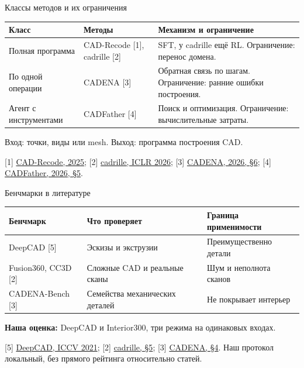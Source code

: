 \documentclass[aspectratio=169,11pt]{beamer}
\newcommand{\source}[1]{\par\vfill{\fontsize{7.2}{8.8}\selectfont\color{Muted}#1\par}}
\newcommand{\smalltext}{\fontsize{9.7}{12}\selectfont}
\begin{document}
\begin{frame}{Классы методов и их ограничения}\relax
{\smalltext
\begin{tabular}{@{}L{.23\textwidth}L{.22\textwidth}L{.48\textwidth}@{}}
\toprule
\textbf{Класс} & \textbf{Методы} & \textbf{Механизм и ограничение}\\
\midrule
Полная программа & CAD-Recode [1], cadrille [2] & SFT, у cadrille ещё RL. Ограничение: перенос домена.\\
По одной операции & CADENA [3] & Обратная связь по шагам. Ограничение: ранние ошибки построения.\\
Агент с инструментами & CADFather [4] & Поиск и оптимизация. Ограничение: вычислительные затраты.\\
\bottomrule
\end{tabular}}
\par\medskip
{\smalltext Вход: точки, виды или mesh. Выход: программа построения CAD.}
\source{[1] \href{https://arxiv.org/abs/2412.14042}{CAD-Recode, 2025};
[2] \href{https://arxiv.org/abs/2505.22914}{cadrille, ICLR 2026};
[3] \href{https://arxiv.org/abs/2608.00799}{CADENA, 2026, §6};
[4] \href{https://arxiv.org/abs/2610.09127}{CADFather, 2026, §5}.}
\end{frame}

\begin{frame}{Бенчмарки в литературе}\relax
{\smalltext
\begin{tabular}{@{}L{.22\textwidth}L{.34\textwidth}L{.37\textwidth}@{}}
\toprule
\textbf{Бенчмарк} & \textbf{Что проверяет} & \textbf{Граница применимости}\\
\midrule
DeepCAD [5] & Эскизы и экструзии & Преимущественно детали\\
Fusion360, CC3D [2] & Сложные CAD и реальные сканы & Шум и неполнота сканов\\
CADENA-Bench [3] & Семейства механических деталей & Не покрывает интерьер\\
\bottomrule
\end{tabular}}
\par\bigskip
\textbf{Наша оценка:} DeepCAD и Interior300, три режима на одинаковых входах.
\source{[5] \href{https://arxiv.org/abs/2105.09492}{DeepCAD, ICCV 2021};
[2] \href{https://arxiv.org/html/2505.22914v3}{cadrille, §5};
[3] \href{https://arxiv.org/html/2608.00799v1}{CADENA, §4}.
Наш протокол локальный, без прямого рейтинга относительно статей.}
\end{frame}
\end{document}
